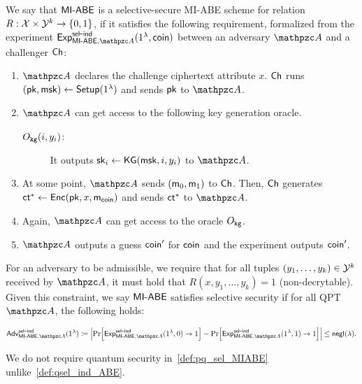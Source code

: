 \begin{definition}\label{def:pq_sel_MIABE}
We say that $\mathsf{MI}\textrm{-}\mathsf{ABE}$ is a selective-secure MI-ABE scheme for relation
$R:\mathcal{X} \times \mathcal{Y}^k \rightarrow \{0,1\}$, if it satisfies the following
requirement, formalized from the experiment
$\expb{\MIABE, \qA}{sel}{ind}(1^\secp,\coin)$ between an adversary
$\qA$ and a challenger $\mathsf{Ch}$:

\begin{enumerate}
\item $\qA$ declares the challenge ciphertext attribute
$x$. $\mathsf{Ch}$ runs $(\mathsf{pk},\mathsf{msk})\leftarrow\mathsf{Setup}(1^\lambda)$ and sends $\mathsf{pk}$ to $\qA$.

\item $\qA$ can get access to the following key generation oracle.

\begin{description}
\item[$O_{\mathtt{kg}}(i, y_i)$:] It outputs $\mathsf{sk}_i \leftarrow \mathsf{KG}(\mathsf{msk}, i,
y_i)$ to $\qA$.

\end{description}

\item At some point, $\qA$ sends $(\mathsf{m}_0,\mathsf{m}_1)$ to $\mathsf{Ch}$. Then, $\mathsf{Ch}$
generates $\mathsf{ct}^*\leftarrow\mathsf{Enc}(\mathsf{pk},x,\mathsf{m}_{\mathsf{coin}})$ and sends $\mathsf{ct}^*$ to
$\qA$.

\item Again, $\qA$ can get access to the oracle $O_{\mathtt{kg}}$.
\item $\qA$ outputs a guess $\mathsf{coin}^\prime$ for $\mathsf{coin}$ and the
experiment outputs $\mathsf{coin}'$.
\end{enumerate}

For an adversary to be admissible, we require that for all tuples
$(y_1, \ldots, y_k) \in \mathcal{Y}^k$ received by $\qA$, it must hold that
$R(x, y_1, \ldots, y_k) = 1$ (non-decrytable). Given this
constraint, we say $\mathsf{MI}\textrm{-}\mathsf{ABE}$ satisfies selective security if for all
QPT $\qA$, the following holds:

\begin{align}
\advb{\MIABE,\qA}{sel}{ind}(1^\secp) \seteq
\abs{\Pr[\expb{\MIABE,\qA}{sel}{ind} (1^\secp,0) \ra 1] -
\Pr[\expb{\MIABE,\qA}{sel}{ind} (1^\secp,1) \ra 1] }\leq \negl(\secp).
\end{align}

%

\end{definition}
\begin{remark}
    We do not require quantum security in~\cref{def:pq_sel_MIABE} unlike~\cref{def:qsel_ind_ABE}.
\end{remark}

